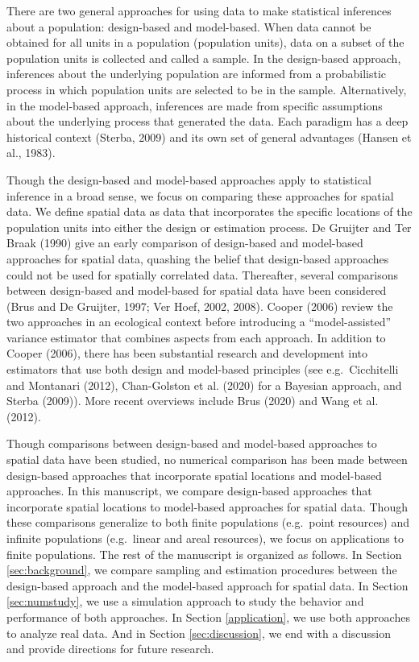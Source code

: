 \documentclass[]{elsarticle} %
\begin{document}
There are two general approaches for using data to make statistical
inferences about a population: design-based and model-based. When data
cannot be obtained for all units in a population (population units),
data on a subset of the population units is collected and called a
sample. In the design-based approach, inferences about the underlying
population are informed from a probabilistic process in which population
units are selected to be in the sample. Alternatively, in the
model-based approach, inferences are made from specific assumptions
about the underlying process that generated the data. Each paradigm has
a deep historical context (Sterba, 2009) and its own set of general
advantages (Hansen et al., 1983).

Though the design-based and model-based approaches apply to statistical
inference in a broad sense, we focus on comparing these approaches for
spatial data. We define spatial data as data that incorporates the
specific locations of the population units into either the design or
estimation process. De Gruijter and Ter Braak (1990) give an early
comparison of design-based and model-based approaches for spatial data,
quashing the belief that design-based approaches could not be used for
spatially correlated data. Thereafter, several comparisons between
design-based and model-based for spatial data have been considered (Brus
and De Gruijter, 1997; Ver Hoef, 2002, 2008). Cooper (2006) review the
two approaches in an ecological context before introducing a
``model-assisted'' variance estimator that combines aspects from each
approach. In addition to Cooper (2006), there has been substantial
research and development into estimators that use both design and
model-based principles (see e.g.~Cicchitelli and Montanari (2012),
Chan-Golston et al. (2020) for a Bayesian approach, and Sterba (2009)).
More recent overviews include Brus (2020) and Wang et al. (2012).

Though comparisons between design-based and model-based approaches to
spatial data have been studied, no numerical comparison has been made
between design-based approaches that incorporate spatial locations and
model-based approaches. In this manuscript, we compare design-based
approaches that incorporate spatial locations to model-based approaches
for spatial data. Though these comparisons generalize to both finite
populations (e.g.~point resources) and infinite populations (e.g.~linear
and areal resources), we focus on applications to finite populations.
The rest of the manuscript is organized as follows. In Section
\ref{sec:background}, we compare sampling and estimation procedures
between the design-based approach and the model-based approach for
spatial data. In Section \ref{sec:numstudy}, we use a simulation
approach to study the behavior and performance of both approaches. In
Section \ref{application}, we use both approaches to analyze real data.
And in Section \ref{sec:discussion}, we end with a discussion and
provide directions for future research.
\end{document}
